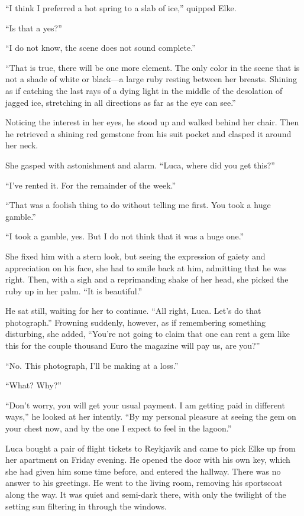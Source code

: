 ``I think I preferred a hot spring to a slab of ice,'' quipped Elke.

``Is that a yes?''

``I do not know, the scene does not sound complete.''

``That is true, there will be one more element. The only color in the scene that is not a shade of white or black---a large ruby resting between her breasts. Shining as if catching the last rays of a dying light in the middle of the desolation of jagged ice, stretching in all directions as far as the eye can see.''

Noticing the interest in her eyes, he stood up and walked behind her chair. Then he retrieved a shining red gemstone from his suit pocket and clasped it around her neck.

She gasped with astonishment and alarm. ``Luca, where did you get this?''

``I've rented it. For the remainder of the week.''

``That was a foolish thing to do without telling me first. You took a huge gamble.''

``I took a gamble, yes. But I do not think that it was a huge one.''

She fixed him with a stern look, but seeing the expression of gaiety and appreciation on his face, she had to smile back at him, admitting that he was right. Then, with a sigh and a reprimanding shake of her head, she picked the ruby up in her palm. ``It is beautiful.''

He sat still, waiting for her to continue. ``All right, Luca. Let's do that photograph.'' Frowning suddenly, however, as if remembering something disturbing, she added, ``You're not going to claim that one can rent a gem like this for the couple thousand Euro the magazine will pay us, are you?''

``No. This photograph, I'll be making at a loss.''

``What? Why?''

``Don't worry, you will get your usual payment. I am getting paid in different ways,'' he looked at her intently. ``By my personal pleasure at seeing the gem on your chest now, and by the one I expect to feel in the lagoon.''

\sectionline

Luca bought a pair of flight tickets to Reykjavik and came to pick Elke up from her apartment on Friday evening. He opened the door with his own key, which she had given him some time before, and entered the hallway. There was no answer to his greetings. He went to the living room, removing his sportscoat along the way. It was quiet and semi-dark there, with only the twilight of the setting sun filtering in through the windows.

